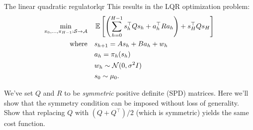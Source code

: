 \documentclass[\main/main]{subfiles}
\begin{document}
\begin{definition}{The linear quadratic regulator}{lqr}
    \noindent This results in the LQR optimization problem:
    \begin{align*}
        \min_{\pi_0, \dots, \pi_{H-1} : \mathcal{S} \to \mathcal{A}} \quad & \operatorname*{\mathbb{E}} \left[ \left( \sum_{h=0}^{H-1} s_h^\top Q s_h + a_h^\top R a_h \right) + s_H^\top Q s_H \right] \\
        \textrm{where} \quad                                & s_{h+1} = A s_h + B a_h + w_h                                                                                        \\
                                                            & a_h = \pi_h (s_h)                                                                                                        \\
                                                            & w_h \sim \mathcal{N}(0, \sigma^2 I)                                                                                               \\
                                                            & s_0 \sim \mu_0.
    \end{align*}
\end{definition}

\begin{exercise}
    We've set $Q$ and $R$ to be \emph{symmetric} positive definite (SPD) matrices. Here we'll show that the symmetry condition can be imposed without loss of generality. Show that replacing $Q$ with $(Q + Q^\top) / 2$ (which is symmetric) yields the same cost function.
\end{exercise}
\end{document}

